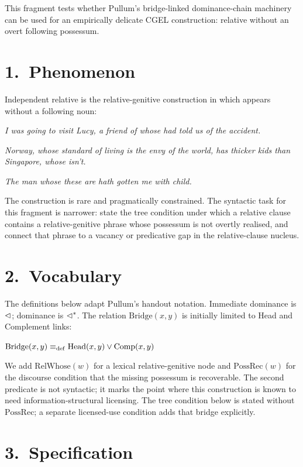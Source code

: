 \documentclass[11pt]{article}
\newcommand{\Bridge}{\mathrm{Bridge}}
\newcommand{\RelWhose}{\mathrm{RelWhose}}
\newcommand{\PossRec}{\mathrm{PossRec}}
\begin{document}
\fragmenthead

\noindent
This fragment tests whether Pullum's bridge-linked dominance-chain machinery
can be used for an empirically delicate CGEL construction: relative
 without an overt following possessum.

\section*{1.~Phenomenon}

Independent relative  is the relative-genitive construction in
which  appears without a following noun:

\ea
\textit{I was going to visit Lucy, a friend of whose had told us of the accident.}
\z

\ea
\textit{Norway, whose standard of living is the envy of the world, has thicker kids than Singapore, whose isn't.}
\z

\ea
\textit{The man whose these are hath gotten me with child.}
\z

The construction is rare and pragmatically constrained. The syntactic task for
this fragment is narrower: state the tree condition under which a relative
clause contains a relative-genitive phrase whose possessum is not overtly
realised, and connect that phrase to a vacancy or predicative gap in the
relative-clause nucleus.

\section*{2.~Vocabulary}

The definitions below adapt Pullum's handout notation. Immediate dominance is
$\mathrel{\lhd}$; dominance is $\mathrel{\lhd^{*}}$. The relation $\Bridge(x,y)$ is initially limited
to Head and Complement links:

\ea
$\Bridge(x,y) \defas \Hd(x,y) \vee \Cmp(x,y)$\\
\z

We add $\RelWhose(w)$ for a lexical relative-genitive  node and
$\PossRec(w)$ for the discourse condition that the missing possessum is
recoverable. The second predicate is not syntactic; it marks the point where
this construction is known to need information-structural licensing. The tree
condition below is stated without $\PossRec$; a separate licensed-use condition
adds that bridge explicitly.

\section*{3.~Specification}
\end{document}
